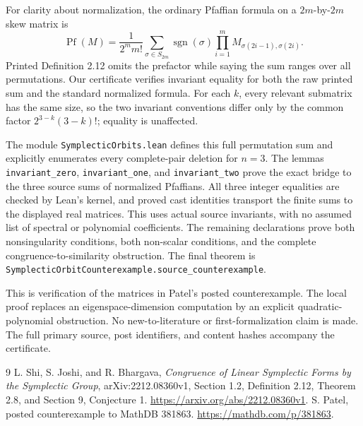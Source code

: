 \documentclass[11pt]{article}
\newcommand{\Pf}{\operatorname{Pf}}
\begin{document}
For clarity about normalization, the ordinary Pfaffian formula on a $2m$-by-$2m$ skew matrix is
\[
 \Pf(M)=\frac1{2^m m!}\sum_{\sigma\in S_{2m}}\operatorname{sgn}(\sigma)
       \prod_{i=1}^m M_{\sigma(2i-1),\sigma(2i)}.
\]
Printed Definition 2.12 omits the prefactor while saying the sum ranges over all permutations. Our certificate verifies invariant equality for both the raw printed sum and the standard normalized formula. For each $k$, every relevant submatrix has the same size, so the two invariant conventions differ only by the common factor $2^{3-k}(3-k)!$; equality is unaffected.

The module \texttt{SymplecticOrbits.lean} defines this full permutation sum and explicitly enumerates every complete-pair deletion for $n=3$. The lemmas \texttt{invariant\_zero}, \texttt{invariant\_one}, and \texttt{invariant\_two} prove the exact bridge to the three source sums of normalized Pfaffians. All three integer equalities are checked by Lean's kernel, and proved cast identities transport the finite sums to the displayed real matrices. This uses actual source invariants, with no assumed list of spectral or polynomial coefficients. The remaining declarations prove both nonsingularity conditions, both non-scalar conditions, and the complete congruence-to-similarity obstruction. The final theorem is \texttt{SymplecticOrbitCounterexample.source\_counterexample}.

This is verification of the matrices in Patel's posted counterexample. The local proof replaces an eigenspace-dimension computation by an explicit quadratic-polynomial obstruction. No new-to-literature or first-formalization claim is made. The full primary source, post identifiers, and content hashes accompany the certificate.
\begin{thebibliography}{9}
 L. Shi, S. Joshi, and R. Bhargava, \emph{Congruence of Linear Symplectic Forms by the Symplectic Group}, arXiv:2212.08360v1, Section 1.2, Definition 2.12, Theorem 2.8, and Section 9, Conjecture 1. \url{https://arxiv.org/abs/2212.08360v1}.
 S. Patel, posted counterexample to MathDB 381863. \url{https://mathdb.com/p/381863}.
\end{thebibliography}
\end{document}
